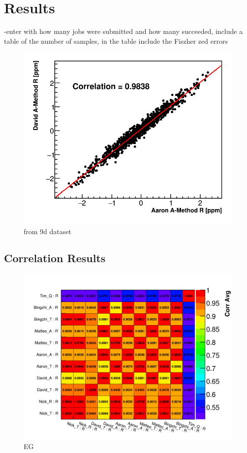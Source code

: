 
\graphicspath{{Body/Figures/Correlations/}}

\section{Results}


-enter with how many jobs were submitted and how many succeeded, include a table of the number of samples, in the table include the Fiszher zed errors


\begin{figure}[]
\centering
\includegraphics[width=\textwidth]{ScatterPlot}
\caption{from 9d dataset}
\label{fig:}
\end{figure}



\subsection{Correlation Results}



\begin{figure}[]
\centering
\includegraphics[width=\textwidth]{Avg_CorrelationMatrix_R_R}
\caption{EG}
\label{fig:}
\end{figure}


